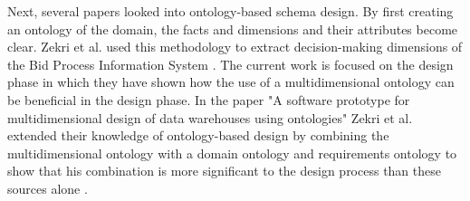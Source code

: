 \documentclass[11pt]{article}
\begin{document}
Next, several papers looked into ontology-based schema design. By first creating an ontology of the domain, the facts and dimensions and their attributes become clear. Zekri et al. used this methodology to extract decision-making dimensions of the Bid Process Information System \cite{Zekri2019285, Zekri20191190}. The current work is focused on the design phase in which they have shown how the use of a multidimensional ontology can be beneficial in the design phase. In the paper "A software prototype for multidimensional design of data warehouses using ontologies" Zekri et al. extended their knowledge of ontology-based design by combining the multidimensional ontology with a domain ontology and requirements ontology to show that his combination is more significant to the design process than these sources alone \cite{Zekri2019273}. \\
\end{document}
